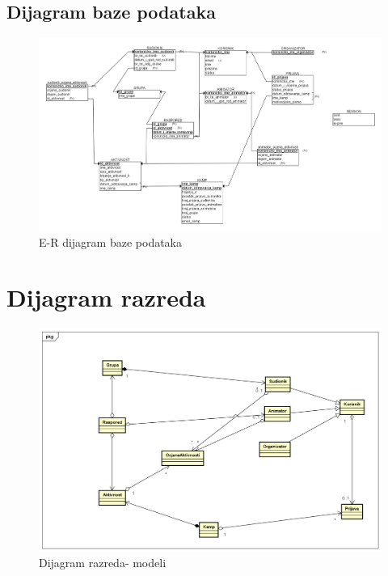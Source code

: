 			\eject
			
			
			\subsection{Dijagram baze podataka}
				\begin{figure}[H]
				\centerline{\includegraphics[width=\linewidth]{slike/ER_model_baze.png}}
				\caption{E-R dijagram baze podataka}
				\label{fig:ERdijagram}
			\end{figure}
			
			\eject
			
			
		\section{Dijagram razreda}
			
			\begin{figure}[H]
				\centerline{\includegraphics[width=\linewidth]{slike/Dijagram_razreda_modeli.png}}
				\caption{Dijagram razreda- modeli}
				\label{fig:dijagram_razreda_modeli}
			\end{figure}
			
			\eject

		
	